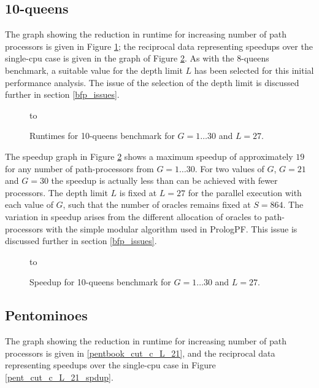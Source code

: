 \subsection{10-queens}

The graph showing the reduction in runtime for increasing number of 
path processors is given in Figure \ref{queens10_cut_c_L_27};  the reciprocal data representing
speedups over the single-cpu case is given in the graph of Figure \ref{q10_cut_c_L_27_spdup}.
As with the 8-queens benchmark, a suitable value for the depth limit $L$ has been selected for this
initial performance analysis.  The issue of the selection of the depth limit is discussed further in
section \ref{bfp_issues}.

\begin{figure}[htb]
\vspace{5mm} \hbox to 
\caption{Runtimes for 10-queens benchmark for $G=1\ldots 30$ and $L=27$.}
\vspace{5mm}
\label{queens10_cut_c_L_27}
\end{figure}

The speedup graph in Figure \ref{q10_cut_c_L_27_spdup} shows a maximum speedup of
approximately $19$ for
any number of path-processors from $G=1\ldots 30$. For two values of $G$, $G=21$
and $G=30$ the speedup is actually less than can be achieved with fewer processors. 
The depth limit $L$ is fixed
at $L=27$ for the parallel execution with each value of $G$, such that the number of oracles
remains fixed at $S=864$.  The variation in speedup arises from the different allocation of 
oracles to path-processors with the simple modular algorithm used in PrologPF.  This issue is 
discussed further in section \ref{bfp_issues}.

\begin{figure}[htb]
\vspace{5mm} \hbox to 
\caption{Speedup for 10-queens benchmark for $G=1\ldots 30$ and $L=27$.}
\vspace{5mm}
\label{q10_cut_c_L_27_spdup}
\end{figure}


\subsection{Pentominoes}

The graph showing the reduction in runtime for increasing number of 
path processors is given in \ref{pentbook_cut_c_L_21},
and the reciprocal data representing
speedups over the single-cpu case in Figure \ref{pent_cut_c_L_21_spdup}.

